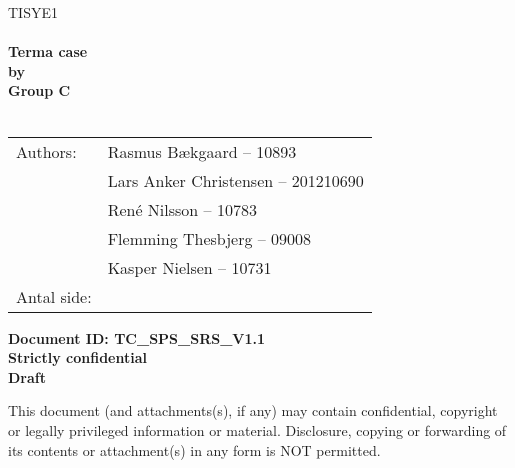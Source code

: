 \documentclass[Main]{subfiles}
\begin{document}
\begin{center}

\textsc{\Large TISYE1}\\[0.5cm]


\HRule \\[0.4cm]

{ \huge \bfseries Terma case}\\[0.4cm]
{ \huge \bfseries by}\\[0.4cm] 
{ \huge \bfseries Group C}\\[0.4cm]

\HRule \\[1.5cm]

\begin{tabular}{p{}|p{}}
\hline 
Authors: & Rasmus Bækgaard -- 10893\\ &Lars Anker Christensen -- 201210690\\ &René Nilsson -- 10783\\ &Flemming Thesbjerg -- 09008\\ &Kasper Nielsen -- 10731\\ 
\hline 
Antal side: & \pageref{LastPage} \\
\hline 
\end{tabular} 

\textbf{\Large Document ID: TC\_SPS\_SRS\_V1.1}\\
\textbf{\Large Strictly confidential}\\
\textbf{\Large Draft}

This document (and attachments(s), if any) may contain confidential, copyright or legally privileged information or material.
Disclosure, copying or forwarding of its contents or attachment(s) in any form is NOT permitted.
\end{center}
\end{document}
